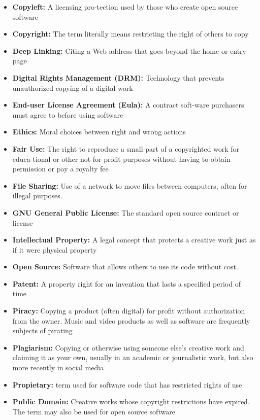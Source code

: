 \documentclass{report}
\begin{document}
    \bigbreak \noindent 
    \begin{itemize}
        \item \textbf{Copyleft:} A licensing pro-tection used by those who create open source software
        \item \textbf{Copyright:} The term literally means restricting the right of others to copy
        \item \textbf{Deep Linking:} Citing a Web address that goes beyond the home or entry page
        \item \textbf{Digital Rights Management (DRM):} Technology that prevents unauthorized  copying of a digital work
        \item \textbf{End-user License Agreement (Eula):} A contract soft-ware purchasers must agree to before using software
        \item \textbf{Ethics:} Moral choices between right and wrong actions
        \item \textbf{Fair Use:} The right to reproduce a small part of a copyrighted work for educa-tional or other not-for-profit purposes without having to obtain permission or pay a royalty fee
        \item \textbf{File Sharing:} Use of a  network to move files between computers,  often for illegal purposes.
        \item \textbf{GNU General Public License:} The standard open source contract or license
        \item \textbf{Intellectual Property:} A legal concept that protects a creative work just as if it were physical property
        \item \textbf{Open Source:} Software that allows others to use its code without cost.
        \item \textbf{Patent:} A property right for an invention that lasts a  specified period of time
        \item \textbf{Piracy:} Copying a product  (often digital) for profit without authorization from the owner. Music and video products as well as software are frequently subjects of pirating
        \item \textbf{Plagiarism:} Copying or otherwise using someone else’s creative work and claiming it as your own,  usually in an academic or journalistic work, but also more recently in social media
        \item \textbf{Propietary:} term used for software code that has restricted rights of use
        \item \textbf{Public Domain:} Creative works whose copyright restrictions have expired. The term may also be used for open source software

\end{itemize}
\end{document}
